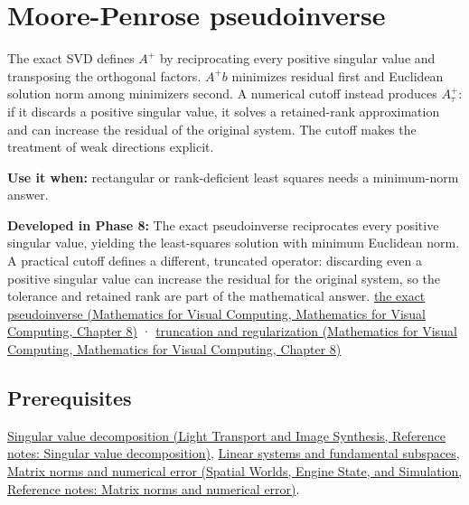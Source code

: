 \hypertarget{appendix-541306fdbc1b}{}\label{referencestart:appendix-541306fdbc1b}
\section{Moore-Penrose pseudoinverse}\label{appendix-541306fdbc1b-moore-penrose-pseudoinverse}

The exact SVD defines \(A^+\) by reciprocating every positive singular value and transposing the orthogonal factors. \(A^+b\) minimizes residual first and Euclidean solution norm among minimizers second. A numerical cutoff instead produces \(A_\tau^+\): if it discards a positive singular value, it solves a retained-rank approximation and can increase the residual of the original system. The cutoff makes the treatment of weak directions explicit.

\textbf{Use it when:} rectangular or rank-deficient least squares needs a minimum-norm answer.

\textbf{Developed in Phase 8:} The exact pseudoinverse reciprocates every positive singular value, yielding the least-squares solution with minimum Euclidean norm. A practical cutoff defines a different, truncated operator: discarding even a positive singular value can increase the residual for the original system, so the tolerance and retained rank are part of the mathematical answer. \href{../02-Mathematics-for-Visual-Computing/main.pdf\#nameddest=02-foundations-ii-ch024-the-moorepenrose-inverse-and-its-four-identities}{the exact pseudoinverse (Mathematics for Visual Computing, Mathematics for Visual Computing, Chapter 8)} · \href{../02-Mathematics-for-Visual-Computing/main.pdf\#nameddest=02-foundations-ii-ch024-thresholding-and-regularization-are-different-choices}{truncation and regularization (Mathematics for Visual Computing, Mathematics for Visual Computing, Chapter 8)}

\subsection{Prerequisites}\label{appendix-541306fdbc1b-prerequisites}

\href{../04-Light-Transport-and-Image-Synthesis/main.pdf\#nameddest=appendix-1fad5e7f36fa}{Singular value decomposition (Light Transport and Image Synthesis, Reference notes: Singular value decomposition)}, \hyperref[appendix-8572a4a060c1]{Linear systems and fundamental subspaces}, \href{../05-Spatial-Worlds-Engine-State-and-Simulation/main.pdf\#nameddest=appendix-f8657bac66e5}{Matrix norms and numerical error (Spatial Worlds, Engine State, and Simulation, Reference notes: Matrix norms and numerical error)}.


